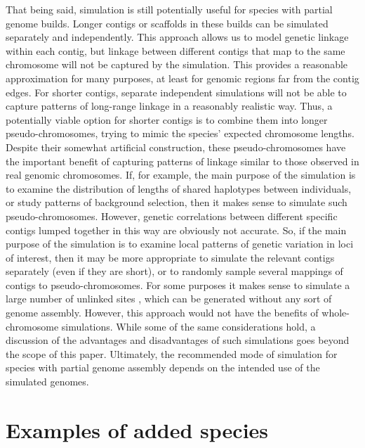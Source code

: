 \documentclass[hidelinks]{article}
\makeatletter
\newcommand{\labelname}[1]{\def\@currentlabelname{#1}}
\makeatother
\begin{document}
That being said, simulation is still potentially useful for species with partial genome builds.
Longer contigs or scaffolds in these builds can be simulated separately and independently.
This approach allows us to model genetic linkage within each contig,
but linkage between different contigs that map to the same chromosome will not be captured by the simulation.
This provides a reasonable approximation for many purposes, at least for genomic regions far from the contig edges.
For shorter contigs, separate independent simulations will not be able to capture patterns of long-range linkage in a reasonably realistic way.
Thus, a potentially viable option for shorter contigs is to combine them into longer pseudo-chromosomes, trying to mimic the species' expected chromosome lengths.
Despite their somewhat artificial construction,
these pseudo-chromosomes have the important benefit of
capturing patterns of linkage similar to those observed in real genomic chromosomes.
If, for example, the main purpose of the simulation is to examine the distribution of lengths of shared haplotypes between individuals,
or study patterns of background selection,
then it makes sense to simulate such pseudo-chromosomes.
However, genetic correlations between different specific contigs lumped together in this way are obviously not accurate.
So, if the main purpose of the simulation is to examine local patterns of genetic variation in loci of interest, then it may be more appropriate to simulate the relevant contigs separately (even if they are short), or to randomly sample several mappings of contigs to pseudo-chromosomes.
For some purposes it makes sense to simulate a large number of unlinked sites \citep{Gutenkunst2009,Excoffier2013},
which can be generated without any sort of genome assembly.
However, this approach would not have the benefits of whole-chromosome simulations.
While some of the same considerations hold, a discussion of the advantages and disadvantages of such simulations goes beyond the scope of this paper.
Ultimately, the recommended mode of simulation for species with partial genome assembly depends on the intended use of the simulated genomes.

\section*{Examples of added species}
    \labelname{Examples}
    \label{sec:examples}
\end{document}
